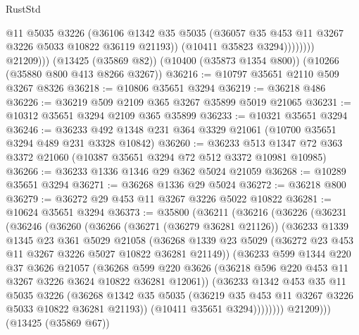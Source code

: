 \begin{lexlean}{RustStd}
\begin{coremodule}
                        @11
                        @5035
                        @3226
                        (@36106
                          @1342
                          @35
                          @5035
                          (@36057 @35 @453 @11 @3267 @3226 @5033 @10822 @36119 @21193))
                        (@10411 @35823 @3294))))))))
          @21209)))
    (@13425 (@35869 @82))
    (@10400 (@35873 @1354 @800))
    (@10266 (@35880 @800 @413 @8266 @3267))
@36216 := @10797 @35651 @2110 @509 @3267 @8326
@36218 := @10806 @35651 @3294
@36219 := @36218 @486
@36226 := @36219 @509 @2109 @365 @3267 @35899 @5019 @21065
@36231 := @10312 @35651 @3294 @2109 @365 @35899
@36233 := @10321 @35651 @3294
@36246 := @36233 @492 @1348 @231 @364 @3329 @21061 (@10700 @35651 @3294 @489 @231 @3328 @10842)
@36260 := @36233 @513 @1347 @72 @363 @3372 @21060 (@10387 @35651 @3294 @72 @512 @3372 @10981 @10985)
@36266 := @36233 @1336 @1346 @29 @362 @5024 @21059
@36268 := @10289 @35651 @3294
@36271 := @36268 @1336 @29 @5024
@36272 := @36218 @800
@36279 := @36272 @29 @453 @11 @3267 @3226 @5022 @10822
@36281 := @10624 @35651 @3294
@36373 := @35800
    (@36211
      (@36216
        (@36226
          (@36231
            (@36246
              (@36260
                (@36266
                  (@36271 (@36279 @36281 @21126))
                  (@36233
                    @1339
                    @1345
                    @23
                    @361
                    @5029
                    @21058
                    (@36268
                      @1339
                      @23
                      @5029
                      (@36272 @23 @453 @11 @3267 @3226 @5027 @10822 @36281 @21149))
                    (@36233
                      @599
                      @1344
                      @220
                      @37
                      @3626
                      @21057
                      (@36268
                        @599
                        @220
                        @3626
                        (@36218 @596 @220 @453 @11 @3267 @3226 @3624 @10822 @36281 @12061))
                      (@36233
                        @1342
                        @453
                        @35
                        @11
                        @5035
                        @3226
                        (@36268
                          @1342
                          @35
                          @5035
                          (@36219 @35 @453 @11 @3267 @3226 @5033 @10822 @36281 @21193))
                        (@10411 @35651 @3294))))))))
          @21209)))
    (@13425 (@35869 @67))

\end{coremodule}
\end{lexlean}
